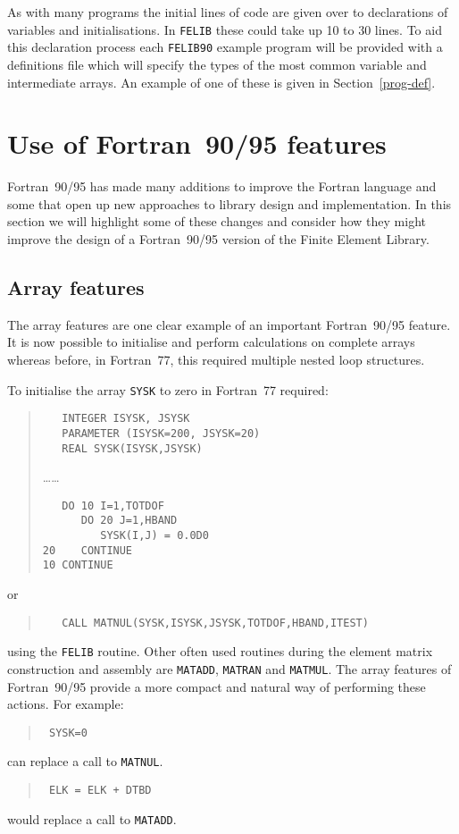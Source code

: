\documentclass[a4paper,titlepage,11pt]{article}
\begin{document}
As with many programs the initial lines of code are given over to declarations
of variables and initialisations. In {\tt FELIB} these could take up 10 to 30
lines. To aid this declaration process each {\tt FELIB90} example program will 
be provided with a definitions file which will specify the types of the most 
common variable and intermediate arrays. 
An example of one of these is given in Section~\ref{prog-def}.

\section{Use of Fortran~90/95 features}
Fortran~90/95 has made many additions to improve the Fortran language and some that
open up new approaches to library design and implementation. In this section
we will highlight some of these changes and consider how they might improve
the design of a Fortran~90/95 version of the Finite Element Library.
\subsection{Array features}
The array features are one clear example of an important Fortran~90/95 feature. It is now
possible to initialise and perform calculations on complete arrays whereas
before, in Fortran~77, this required multiple nested loop structures.

To initialise the array {\tt SYSK} to zero in Fortran~77 required:

\begin{quote}
\source	
\begin{verbatim}
   INTEGER ISYSK, JSYSK
   PARAMETER (ISYSK=200, JSYSK=20)
   REAL SYSK(ISYSK,JSYSK)
\end{verbatim}
\ldots\ldots
\begin{verbatim}
   DO 10 I=1,TOTDOF
      DO 20 J=1,HBAND
         SYSK(I,J) = 0.0D0
20    CONTINUE
10 CONTINUE
\end{verbatim}
\end{quote}
or
\begin{quote}
\source
\begin{verbatim}
   CALL MATNUL(SYSK,ISYSK,JSYSK,TOTDOF,HBAND,ITEST)
\end{verbatim}
\end{quote}
using the {\tt FELIB} routine. Other often used routines during the element
matrix construction and assembly are {\tt MATADD}, {\tt MATRAN} and {\tt MATMUL}. 
The array features of Fortran~90/95 provide a more compact and natural way of performing
these actions. For example:
\begin{quote}
\tt\source
SYSK=0
\end{quote}
can replace a call to {\tt MATNUL}.
\begin{quote}
\tt\source
ELK = ELK + DTBD
\end{quote}
would replace a call to {\tt MATADD}.
\end{document}
